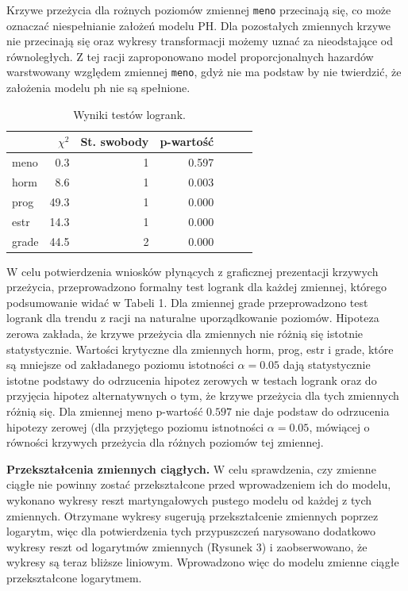 \documentclass[]{article}
\begin{document}
Krzywe przeżycia dla rożnych poziomów zmiennej \texttt{meno} przecinają
się, co może oznaczać niespełnianie założeń modelu PH. Dla pozostałych
zmiennych krzywe nie przecinają się oraz wykresy transformacji możemy
uznać za nieodstające od równoległych. Z tej racji zaproponowano model
proporcjonalnych hazardów warstwowany względem zmiennej \texttt{meno},
gdyż nie ma podstaw by nie twierdzić, że założenia modelu ph nie są
spełnione.

\begin{table}
\vspace{-20pt}
\caption{ Wyniki testów logrank. }
\begin{tabular}{lrrrrrr}
\toprule%
\ &$\chi^2$&St. swobody&p-wartość\\ \toprule meno&0.3&1&0.597\\ horm&8.6&1&0.003\\ prog&49.3&1&0.000\\ estr&14.3&1&0.000\\ grade&44.5&2&0.000\\  \bottomrule
\end{tabular}
\vspace{-7.5pt}
\end{table}

W celu potwierdzenia wniosków płynących z graficznej prezentacji
krzywych przeżycia, przeprowadzono formalny test logrank dla każdej
zmiennej, którego podsumowanie widać w Tabeli 1. Dla zmiennej
\textsf{grade} przeprowadzono test logrank dla trendu z racji na
naturalne uporządkowanie poziomów. Hipoteza zerowa zakłada, że krzywe
przeżycia dla zmiennych nie różnią się istotnie statystycznie. Wartości
krytyczne dla zmiennych \textsf{horm}, \textsf{prog}, \textsf{estr} i
\textsf{grade}, które są mniejsze od zakładanego poziomu istotności
$\alpha=0.05$ dają statystycznie istotne podstawy do odrzucenia hipotez
zerowych w testach logrank oraz do przyjęcia hipotez alternatywnych o
tym, że krzywe przeżycia dla tych zmiennych różnią się. Dla zmiennej
\textsf{meno} p-wartość $0.597$ nie daje podstaw do odrzucenia hipotezy
zerowej (dla przyjętego poziomu istnotności $\alpha=0.05$, mówiącej o
równości krzywych przeżycia dla różnych poziomów tej zmiennej.

\newpage
\textbf{Przekształcenia zmiennych ciągłych.} \newline
W celu sprawdzenia, czy zmienne ciągłe nie powinny zostać przekształcone
przed wprowadzeniem ich do modelu, wykonano wykresy reszt martyngałowych
pustego modelu od każdej z tych zmiennych. Otrzymane wykresy sugerują
przekształcenie zmiennych poprzez logarytm, więc dla potwierdzenia tych
przypuszczeń narysowano dodatkowo wykresy reszt od logarytmów zmiennych
(Rysunek 3) i zaobserwowano, że wykresy są teraz bliższe liniowym.
Wprowadzono więc do modelu zmienne ciągłe przekształcone logarytmem.
\end{document}
